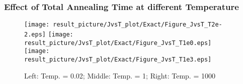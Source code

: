 \documentclass{beamer}
\begin{document}
%	
%	
%	
%	
%	
%
%
%	
%
%	
%	






\begin{frame}
	\frametitle{Effect of Total Annealing Time at different Temperature}

	\begin{figure}
		\centering
		\texttt{[image: result\_picture/JvsT\_plot/Exact/Figure\_JvsT\_T2e-2.eps]}
		\hfill
		\texttt{[image: result\_picture/JvsT\_plot/Exact/Figure\_JvsT\_T1e0.eps]}
		\hfill
		\texttt{[image: result\_picture/JvsT\_plot/Exact/Figure\_JvsT\_T1e3.eps]}
		 \caption{Left: Temp. = 0.02; Middle: Temp. = 1; Right: Temp. = 1000}
	\end{figure}
\end{frame}
\end{document}
